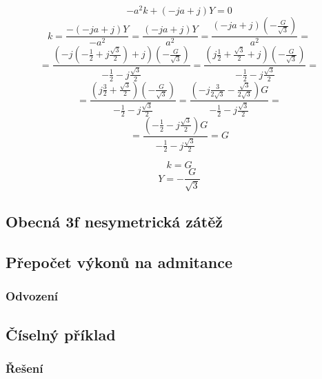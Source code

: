 \documentclass{article}
\begin{document}
$$
    -a^2 k + (-j a + j) Y = 0
$$
$$
    k = \frac{- (-j a + j) Y}{-a^2} = \frac{(-j a + j) Y}{a^2} = \frac{(-j a + j) \left( -\frac{G}{\sqrt{3}} \right)}{a^2} =
$$
$$
    = \frac{
        \left( -j \left( -\frac{1}{2} + j \frac{\sqrt{3}}{2} \right) + j \right) \left( -\frac{G}{\sqrt{3}} \right)
    }{
        -\frac{1}{2} - j \frac{\sqrt{3}}{2}
    } = \frac{
        \left( j \frac{1}{2} + \frac{\sqrt{3}}{2} + j \right) \left( -\frac{G}{\sqrt{3}} \right)
    }{
        -\frac{1}{2} - j \frac{\sqrt{3}}{2}
    } =
$$
$$
    = \frac{
        \left( j \frac{3}{2} + \frac{\sqrt{3}}{2} \right) \left( -\frac{G}{\sqrt{3}} \right)
    }{
        -\frac{1}{2} - j \frac{\sqrt{3}}{2}
    } = \frac{
        \left( - j \frac{3}{2 \sqrt{3}} - \frac{\sqrt{3}}{2 \sqrt{3}} \right) G
    }{
        -\frac{1}{2} - j \frac{\sqrt{3}}{2}
    } =
$$
$$
    = \frac{
        \left( -\frac{1}{2} - j \frac{\sqrt{3}}{2} \right) G
    }{
        -\frac{1}{2} - j \frac{\sqrt{3}}{2}
    } = G
$$

$$
    k = G
$$
$$
    Y = -\frac{G}{\sqrt{3}}
$$


\subsection{Obecná 3f nesymetrická zátěž \spicy \spicy \spicy}


\subsection{Přepočet výkonů na admitance}

\subsubsection{Odvození \spicy \spicy \spicy}




\subsection{Číselný příklad}

\subsubsection{Řešení}
\end{document}
